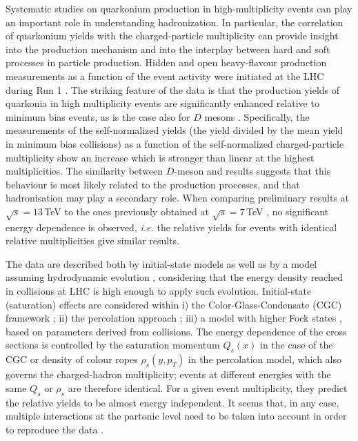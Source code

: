 \documentclass[../report.tex]{subfiles}
\begin{document}
Systematic studies on quarkonium production in high-multiplicity \pp events can play an important role in understanding hadronization.
In particular, the correlation of quarkonium yields with the charged-particle multiplicity can provide insight into the production mechanism and into the interplay between hard and soft processes in particle production.
Hidden and open heavy-flavour production measurements as a function of the event activity were initiated  at the LHC during Run 1  \cite{Abelev:2012rz,Chatrchyan:2013nza}.  
The striking feature of the data is that the production yields of quarkonia in high multiplicity events are significantly enhanced relative to minimum bias events, as is the case also for $D$ mesons \cite{Adam:2015ota}.
Specifically, the measurements of the self-normalized yields (the yield divided by the mean yield in minimum bias collisions) as a function of the self-normalized charged-particle multiplicity show an increase which is stronger than linear at the highest multiplicities. %
%
The similarity between $D$-meson and \PJgy results \cite{Abelev:2012rz,Adam:2015ota} suggests that this behaviour is most likely related to the production processes, and that hadronisation may play a secondary role.
When comparing \PJgy preliminary results at $\sqrt{s}=13$\,TeV \cite{Weber:2017hhm} to the ones previously obtained at $\sqrt{s} = 7$\,TeV \cite{Abelev:2012rz}, no significant energy dependence is observed, {\it i.e.} the relative \PJgy yields for events with identical relative multiplicities give similar results.

The data are described both by initial-state models as well as by a model assuming hydrodynamic evolution \cite{Werner:2013tya}, considering that the energy density reached in \pp collisions at LHC is high enough to apply such evolution.
Initial-state (saturation) effects are considered within
i) the Color-Glass-Condensate (CGC) framework \cite{Ma:2018bax}; ii) the percolation approach \cite{Ferreiro:2012fb,Ferreiro:2015gea}; iii) a model with higher Fock states \cite{Kopeliovich:2013yfa}, based on parameters derived from \pPb collisions.
The energy dependence of the cross sections is controlled by the saturation momentum $Q_s(x)$ in the case of the CGC or density of colour ropes $\rho_s(y,p_T)$ in the percolation model, which also governs the charged-hadron multiplicity; events at different energies with the same $Q_s$ or $\rho_s$ are therefore identical. 
For a given event multiplicity, they predict the relative yields to be almost energy independent.
It seems that, in any case, multiple interactions at the partonic level need to be taken into account in order to reproduce the data \cite{Sjostrand:2014zea,Skands:2014pea,Sjostrand:2017cdm}.
\end{document}
